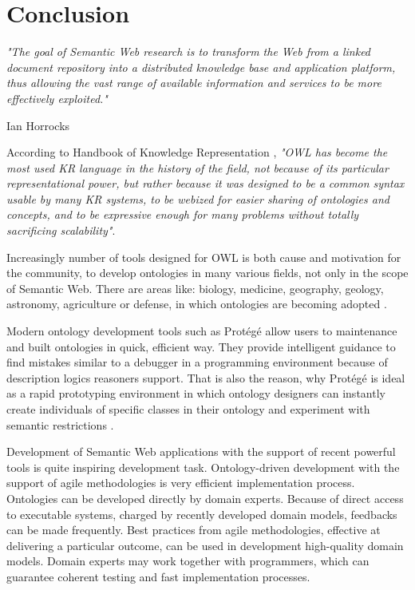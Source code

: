 \chapter{Conclusion}
\label{cha:conclusion}

\textit{"The goal of Semantic Web research is to transform the Web from a linked document repository into a distributed knowledge base and application platform, thus allowing the vast range of available information and services to be more effectively exploited."}
\begin{flushright} Ian Horrocks \cite{HorSSF} \end{flushright}

\noindent According to Handbook of Knowledge Representation \cite{HLP08}, \textit{"OWL has become the most used KR language in the history of the field, not because of its particular representational power, but rather because it was designed to be a common syntax usable by many KR systems, to be webized for easier sharing of ontologies and concepts, and to be expressive enough for many problems without totally sacrificing scalability"}.

Increasingly number of tools designed for OWL is both cause and motivation for the community, to develop ontologies in many various fields, not only in the scope of Semantic Web. There are areas like: biology, medicine, geography, geology, astronomy, agriculture or defense, in which ontologies are becoming adopted \cite{HLP08}.

Modern ontology development tools such as Protégé allow users to maintenance and built ontologies in quick, efficient way. They provide intelligent guidance to find mistakes similar to a debugger in a programming environment because of description logics reasoners support. That is also the reason, why Protégé is ideal as a rapid prototyping environment in which ontology designers can instantly create individuals of specific classes in their ontology and experiment with semantic restrictions \cite{OntDrivDev}.

Development of Semantic Web applications with the support of recent powerful tools is quite inspiring development task. Ontology-driven development with the support of agile methodologies is very efficient implementation process. Ontologies can be developed directly by domain experts. Because of direct access to executable systems, charged by recently developed domain models, feedbacks can be made frequently. Best practices from agile methodologies, effective at delivering a particular outcome, can be used in development high-quality domain models. Domain experts may work together with programmers, which can guarantee coherent testing and fast implementation processes.
